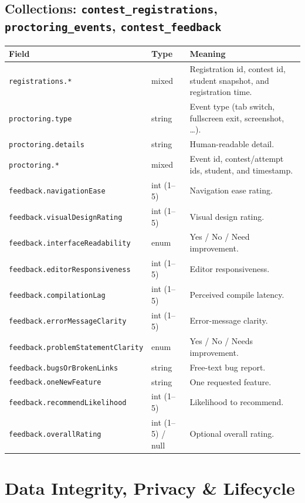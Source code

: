 \documentclass[12pt,a4paper,oneside]{report}
\newcommand{\code}[1]{\texttt{#1}}
\begin{document}
\section{Collections: \code{contest\_registrations}, \code{proctoring\_events}, \code{contest\_feedback}}
\begin{xltabular}{\linewidth}{@{}l l X@{}}
\toprule
\textbf{Field} & \textbf{Type} & \textbf{Meaning}\\
\midrule
\endhead
\code{registrations.*} & mixed & Registration id, contest id, student snapshot, and registration time.\\
\code{proctoring.type} & string & Event type (tab switch, fullscreen exit, screenshot, \ldots).\\
\code{proctoring.details} & string & Human-readable detail.\\
\code{proctoring.*} & mixed & Event id, contest/attempt ids, student, and timestamp.\\
\code{feedback.navigationEase} & int (1--5) & Navigation ease rating.\\
\code{feedback.visualDesignRating} & int (1--5) & Visual design rating.\\
\code{feedback.interfaceReadability} & enum & Yes / No / Need improvement.\\
\code{feedback.editorResponsiveness} & int (1--5) & Editor responsiveness.\\
\code{feedback.compilationLag} & int (1--5) & Perceived compile latency.\\
\code{feedback.errorMessageClarity} & int (1--5) & Error-message clarity.\\
\code{feedback.problemStatementClarity} & enum & Yes / No / Needs improvement.\\
\code{feedback.bugsOrBrokenLinks} & string & Free-text bug report.\\
\code{feedback.oneNewFeature} & string & One requested feature.\\
\code{feedback.recommendLikelihood} & int (1--5) & Likelihood to recommend.\\
\code{feedback.overallRating} & int (1--5) / null & Optional overall rating.\\
\bottomrule
\end{xltabular}

\chapter{Data Integrity, Privacy \& Lifecycle}
\end{document}

